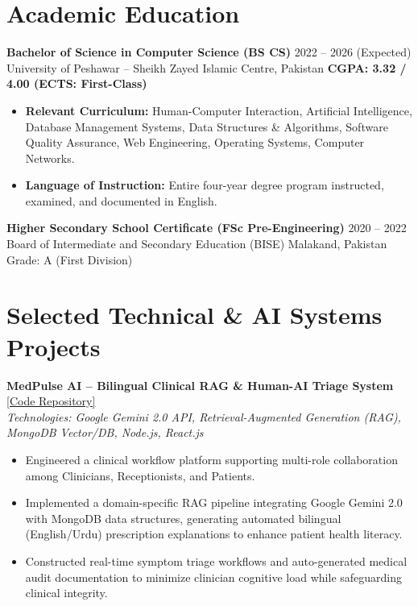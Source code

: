 \documentclass[10pt,a4paper]{article}
\begin{document}
\section{Academic Education}
\textbf{Bachelor of Science in Computer Science (BS CS)} \hfill 2022 -- 2026 (Expected) \\
University of Peshawar -- Sheikh Zayed Islamic Centre, Pakistan \hfill \textbf{CGPA: 3.32 / 4.00 (ECTS: First-Class)}
\begin{itemize}
    \item \textbf{Relevant Curriculum:} Human-Computer Interaction, Artificial Intelligence, Database Management Systems, Data Structures \& Algorithms, Software Quality Assurance, Web Engineering, Operating Systems, Computer Networks.
    \item \textbf{Language of Instruction:} Entire four-year degree program instructed, examined, and documented in English.
\end{itemize}

\vspace{3pt}
\textbf{Higher Secondary School Certificate (FSc Pre-Engineering)} \hfill 2020 -- 2022 \\
Board of Intermediate and Secondary Education (BISE) Malakand, Pakistan \hfill Grade: A (First Division)

\section{Selected Technical \& AI Systems Projects}

\textbf{MedPulse AI -- Bilingual Clinical RAG \& Human-AI Triage System} \hfill \href{https://github.com/nabilroghani/AI-Powered-Clinic-Management-SaaS}{[Code Repository]} \\
\textit{Technologies: Google Gemini 2.0 API, Retrieval-Augmented Generation (RAG), MongoDB Vector/DB, Node.js, React.js}
\begin{itemize}
    \item Engineered a clinical workflow platform supporting multi-role collaboration among Clinicians, Receptionists, and Patients.
    \item Implemented a domain-specific RAG pipeline integrating Google Gemini 2.0 with MongoDB data structures, generating automated bilingual (English/Urdu) prescription explanations to enhance patient health literacy.
    \item Constructed real-time symptom triage workflows and auto-generated medical audit documentation to minimize clinician cognitive load while safeguarding clinical integrity.
\end{itemize}
\end{document}
